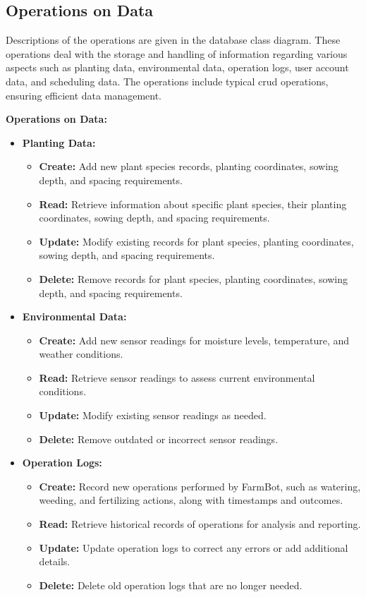 \subsection{Operations on Data}

Descriptions of the operations are given in the database class diagram. These operations deal with the storage and handling of information regarding various aspects such as planting data, environmental data, operation logs, user account data, and scheduling data. The operations include typical \gls{crud}  operations, ensuring efficient data management.

\textbf{Operations on Data:}

\begin{itemize}
    \item \textbf{Planting Data:}
    \begin{itemize}
        \item \textbf{Create:} Add new plant species records, planting coordinates, sowing depth, and spacing requirements.
        \item \textbf{Read:} Retrieve information about specific plant species, their planting coordinates, sowing depth, and spacing requirements.
        \item \textbf{Update:} Modify existing records for plant species, planting coordinates, sowing depth, and spacing requirements.
        \item \textbf{Delete:} Remove records for plant species, planting coordinates, sowing depth, and spacing requirements.
    \end{itemize}
    
    \item \textbf{Environmental Data:}
    \begin{itemize}
        \item \textbf{Create:} Add new sensor readings for moisture levels, temperature, and weather conditions.
        \item \textbf{Read:} Retrieve sensor readings to assess current environmental conditions.
        \item \textbf{Update:} Modify existing sensor readings as needed.
        \item \textbf{Delete:} Remove outdated or incorrect sensor readings.
    \end{itemize}
    
    \item \textbf{Operation Logs:}
    \begin{itemize}
        \item \textbf{Create:} Record new operations performed by FarmBot, such as watering, weeding, and fertilizing actions, along with timestamps and outcomes.
        \item \textbf{Read:} Retrieve historical records of operations for analysis and reporting.
        \item \textbf{Update:} Update operation logs to correct any errors or add additional details.
        \item \textbf{Delete:} Delete old operation logs that are no longer needed.
    \end{itemize}
    

\end{itemize}
